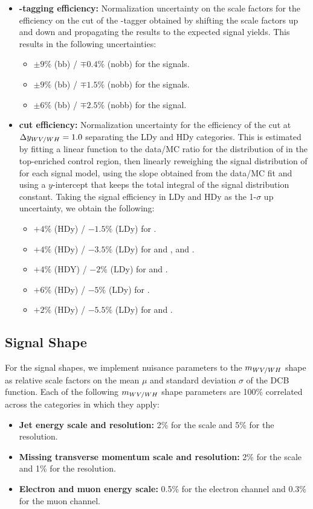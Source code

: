 \begin{itemize}
\begin{itemize}
  \end{itemize}
  \item {\bfseries \bbbar-tagging efficiency:} Normalization uncertainty on the scale factors for the efficiency on the cut of the \bbbar-tagger obtained by shifting the scale factors up and down and propagating the results to the expected signal yields.
  This results in the following uncertainties:
  \begin{itemize}
    \item $\pm9\%$ (bb) / $\mp0.4\%$ (nobb) for the \WW signals.
    \item $\pm9\%$ (bb) / $\mp1.5\%$ (nobb) for the \WZ signals.
    \item $\pm6\%$ (bb) / $\mp2.5\%$ (nobb) for the \WH signal.
  \end{itemize}
  \item {\bfseries \Dy cut efficiency:} Normalization uncertainty for the efficiency of the cut at $\Delta y_{WV/WH}=1.0$ separating the LDy and HDy categories.
  This is estimated by fitting a linear function to the data/MC ratio for the distribution of \Dy in the top-enriched control region, then linearly reweighing the signal distribution of \Dy for each signal model, using the slope obtained from the data/MC fit and using a $y$-intercept that keeps the total integral of the signal distribution constant.
  Taking the signal efficiency in LDy and HDy as the 1-$\sigma$ up uncertainty, we obtain the following:
  \begin{itemize}
    \item $+4\%$ (HDy) / $-1.5\%$ (LDy) for \ggF\GBulktoWW.
    \item $+4\%$ (HDy) / $-3.5\%$ (LDy) for \ggF and \VBF\RadtoWW, and \DY\ZprtoWW.
    \item $+4\%$ (HDY) / $-2\%$ (LDy) for \DY\WprtoWZ and \WprtoWH.
    \item $+6\%$ (HDy) / $-5\%$ (LDy) for \VBF\GBulktoWW.
    \item $+2\%$ (HDy) / $-5.5\%$ (LDy) for \VBF\ZprtoWW and \WprtoWZ.
  \end{itemize}
\end{itemize}

\subsection{Signal Shape}

For the signal shapes, we implement nuisance parameters to the $m_{WV/WH}$ shape as relative scale factors on the mean $\mu$ and standard deviation $\sigma$ of the DCB function.
Each of the following $m_{WV/WH}$ shape parameters are 100\% correlated across the categories in which they apply:
\begin{itemize}
  \item {\bfseries Jet energy scale and resolution:} 2\% for the scale and 5\% for the resolution.
  \item {\bfseries Missing transverse momentum scale and resolution:} 2\% for the scale and 1\% for the resolution.
  \item {\bfseries Electron and muon energy scale:} 0.5\% for the electron channel and 0.3\% for the muon channel.
\end{itemize}

